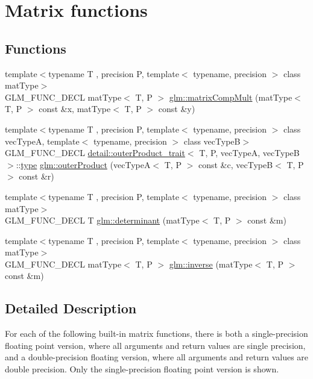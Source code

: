 \hypertarget{group__core__func__matrix}{}\section{Matrix functions}
\label{group__core__func__matrix}
\subsection*{Functions}
\begin{DoxyCompactItemize}
\item 
{\footnotesize template$<$typename T , precision P, template$<$ typename, precision $>$ class mat\+Type$>$ }\\G\+L\+M\+\_\+\+F\+U\+N\+C\+\_\+\+D\+E\+CL mat\+Type$<$ T, P $>$ \hyperlink{group__core__func__matrix_ga4a54992e4741188ee624b21e3ba91814}{glm\+::matrix\+Comp\+Mult} (mat\+Type$<$ T, P $>$ const \&x, mat\+Type$<$ T, P $>$ const \&y)
\item 
{\footnotesize template$<$typename T , precision P, template$<$ typename, precision $>$ class vec\+TypeA, template$<$ typename, precision $>$ class vec\+TypeB$>$ }\\G\+L\+M\+\_\+\+F\+U\+N\+C\+\_\+\+D\+E\+CL \hyperlink{structglm_1_1detail_1_1outerProduct__trait}{detail\+::outer\+Product\+\_\+trait}$<$ T, P, vec\+TypeA, vec\+TypeB $>$\+::\hyperlink{structglm_1_1type}{type} \hyperlink{group__core__func__matrix_gae9f513dc8e4f3ceb993669321b6d0f09}{glm\+::outer\+Product} (vec\+TypeA$<$ T, P $>$ const \&c, vec\+TypeB$<$ T, P $>$ const \&r)
\item 
{\footnotesize template$<$typename T , precision P, template$<$ typename, precision $>$ class mat\+Type$>$ }\\G\+L\+M\+\_\+\+F\+U\+N\+C\+\_\+\+D\+E\+CL T \hyperlink{group__core__func__matrix_ga26ea77c574802bc6fc193c40478718d2}{glm\+::determinant} (mat\+Type$<$ T, P $>$ const \&m)
\item 
{\footnotesize template$<$typename T , precision P, template$<$ typename, precision $>$ class mat\+Type$>$ }\\G\+L\+M\+\_\+\+F\+U\+N\+C\+\_\+\+D\+E\+CL mat\+Type$<$ T, P $>$ \hyperlink{group__core__func__matrix_gaff4e89603cf51cdbcedebc57cd8808a3}{glm\+::inverse} (mat\+Type$<$ T, P $>$ const \&m)
\end{DoxyCompactItemize}


\subsection{Detailed Description}
For each of the following built-\/in matrix functions, there is both a single-\/precision floating point version, where all arguments and return values are single precision, and a double-\/precision floating version, where all arguments and return values are double precision. Only the single-\/precision floating point version is shown. 

